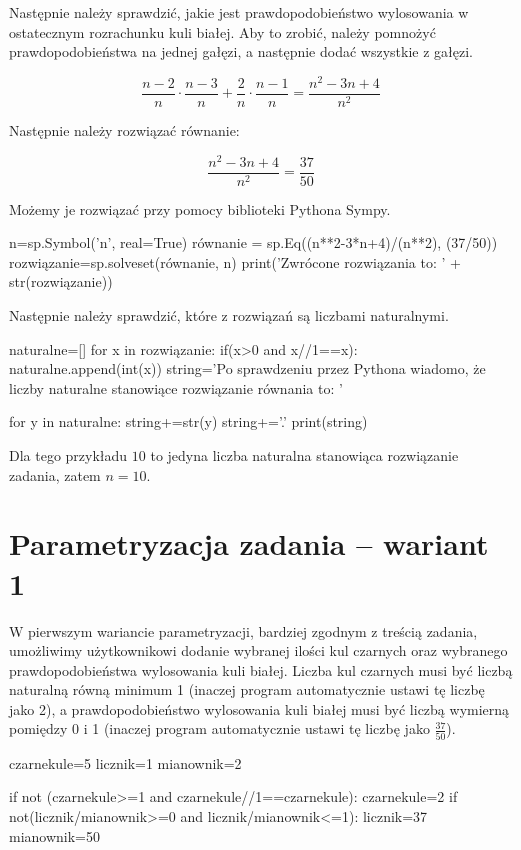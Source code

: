 \documentclass{mwart}
\begin{document}
Następnie należy sprawdzić, jakie jest prawdopodobieństwo wylosowania w ostatecznym rozrachunku kuli białej. Aby to zrobić, należy pomnożyć prawdopodobieństwa na jednej gałęzi, a następnie dodać wszystkie z gałęzi.

\begin{equation}
\frac{n-2}{n}\cdot\frac{n-3}{n}+\frac{2}{n}\cdot\frac{n-1}{n} = \frac{n^2-3n+4}{n^2}
\end{equation}

Następnie należy rozwiązać równanie:

\begin{equation}
\frac{n^2-3n+4}{n^2} = \frac{37}{50}
\end{equation}

Możemy je rozwiązać przy pomocy biblioteki Pythona Sympy.
\begin{pycode}
n=sp.Symbol('n', real=True)
równanie = sp.Eq((n**2-3*n+4)/(n**2), (37/50))
rozwiązanie=sp.solveset(równanie, n)
print('Zwrócone rozwiązania to: ' + str(rozwiązanie))
\end{pycode}

Następnie należy sprawdzić, które z rozwiązań są liczbami naturalnymi.

\begin{pycode}
naturalne=[]
for x in rozwiązanie:
	if(x>0 and x//1==x):
		naturalne.append(int(x))
string='Po sprawdzeniu przez Pythona wiadomo, że liczby naturalne stanowiące rozwiązanie równania to: '

for y in naturalne:
	string+=str(y)
string+='.'
print(string)
\end{pycode}

Dla tego przykładu $10$ to jedyna liczba naturalna stanowiąca rozwiązanie zadania, zatem $n = 10$.

\section{Parametryzacja zadania – wariant 1}
W pierwszym wariancie parametryzacji, bardziej zgodnym z treścią zadania, umożliwimy użytkownikowi dodanie wybranej ilości kul czarnych oraz wybranego prawdopodobieństwa wylosowania kuli białej. Liczba kul czarnych musi być liczbą naturalną równą minimum 1 (inaczej program automatycznie ustawi tę liczbę jako 2), a prawdopodobieństwo wylosowania kuli białej musi być liczbą wymierną pomiędzy 0 i 1 (inaczej program automatycznie ustawi tę liczbę jako $\frac{37}{50}$).

\begin{pycode}
czarnekule=5
licznik=1
mianownik=2


if not (czarnekule>=1 and czarnekule//1==czarnekule):
	czarnekule=2
if not(licznik/mianownik>=0 and licznik/mianownik<=1):
	licznik=37
	mianownik=50

\end{pycode}
\end{document}
